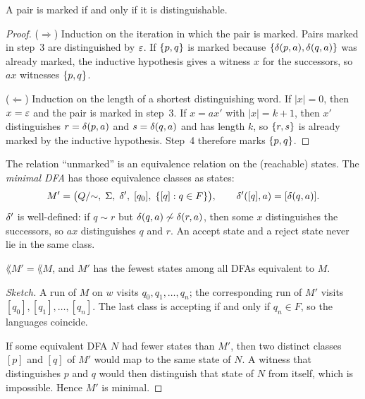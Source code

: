 \begin{theorem}
A pair is marked if and only if it is distinguishable.
\end{theorem}

\begin{proof}
($\Rightarrow$) Induction on the iteration in which the pair is marked. Pairs
marked in step~3 are distinguished by $\varepsilon$. If $\{p,q\}$ is marked because
$\{\delta(p,a),\delta(q,a)\}$ was already marked, the inductive
hypothesis gives a witness $x$ for the successors, so $ax$ witnesses
$\{p,q\}$.

($\Leftarrow$) Induction on the length of a shortest distinguishing word.
If $|x|=0$, then $x=\varepsilon$ and the pair is marked in step~3. If
$x=ax'$ with $|x|=k+1$, then $x'$ distinguishes
$r=\delta(p,a)$ and $s=\delta(q,a)$ and has length $k$, so
$\{r,s\}$ is already marked by the inductive hypothesis. Step~4 therefore
marks $\{p,q\}$.
\end{proof}

The relation ``unmarked'' is an equivalence relation on the (reachable) states.
The \emph{minimal DFA} has those equivalence classes as states:
\[
  M'=\bigl(Q/{\sim},\;\Sigma,\;\delta',\;[q_0],\;
           \{[q]:q\in F\}\bigr),
  \qquad
  \delta'([q],a)=[\delta(q,a)].
\]
$\delta'$ is well-defined: if $q\sim r$ but
$\delta(q,a)\not\sim\delta(r,a)$, then some $x$ distinguishes the
successors, so $ax$ distinguishes $q$ and $r$. An accept state and a reject
state never lie in the same class.

\begin{theorem}
$\lang{M'}=\lang{M}$, and $M'$ has the fewest states among all DFAs equivalent
to $M$.
\end{theorem}

\begin{proof}[Sketch]
A run of $M$ on $w$ visits $q_0,q_1,\ldots,q_n$; the corresponding run of $M'$
visits $[q_0],[q_1],\ldots,[q_n]$. The last class is accepting if and only if
$q_n\in F$, so the languages coincide.

If some equivalent DFA $N$ had fewer states than $M'$, then two distinct
classes $[p]$ and $[q]$ of $M'$ would map to the same state of $N$. A witness
that distinguishes $p$ and $q$ would then distinguish that state of $N$ from
itself, which is impossible. Hence $M'$ is minimal.
\end{proof}

